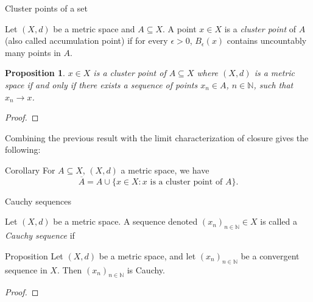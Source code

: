 \documentclass [aspectratio=169]{beamer}
\newcommand{\N}{{\mathbb{N}}}
\newtheorem{proposition}[theorem]{Proposition}
\begin{document}
\begin{frame}{Cluster points of a set}
\begin{definition}
Let $(X,d)$ be a metric space and $A \subseteq X$. A point $x \in X$ is a \emph{cluster point} of $A$ (also called accumulation point) if for every $\epsilon >0$, $B_\epsilon(x)$ contains uncountably many points in $A$.
\end{definition}
\end{frame}

\begin{frame}

\begin{proposition}
 $x \in X$ is a cluster point of $A \subseteq X$ where $(X,d)$ is a metric space if and only if there exists a sequence of points $x_n \in A$, $n \in \N$, such that $x_n \to x$.
\end{proposition}
\begin{proof}
\vspace{4.5cm}
\end{proof}
\end{frame}


\begin{frame}
Combining the previous result with the limit characterization of closure gives the following: 

\begin{exampleblock}{Corollary}
For $A \subseteq X$, $(X,d)$ a metric space, we have $$\overline{A} = A \cup \{x \in X : x \text{ is a cluster point of }A \}.$$
\end{exampleblock}

\end{frame}


\begin{frame}{Cauchy sequences}
\begin{definition}
Let $(X,d)$ be a metric space. A sequence denoted $(x_n)_{n \in \N} \in X$ is called a \emph{Cauchy sequence} if
\vspace{1cm}

\end{definition}

\end{frame}


\begin{frame}
\begin{exampleblock}{Proposition}
\label{prop:converge_means_Cauchy}
Let $(X, d)$ be a metric space, and let $(x_n)_{n\in\N}$ be a convergent sequence in $X$. Then  $(x_n)_{n\in\N}$ is Cauchy.
\end{exampleblock}

\begin{proof}
\vspace{4cm}
\end{proof}

\end{frame}
\end{document}
